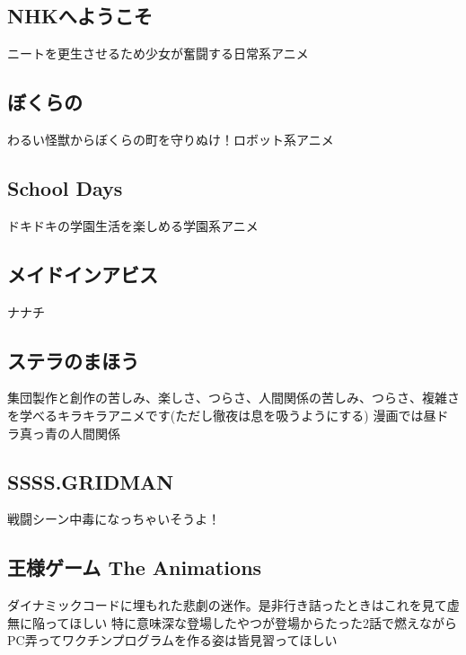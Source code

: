 \documentclass{jarticle}
\begin{document}
   \subsection{NHKへようこそ}
      ニートを更生させるため少女が奮闘する日常系アニメ
   \subsection{ぼくらの}
      わるい怪獣からぼくらの町を守りぬけ！ロボット系アニメ
   \subsection{School Days}
      ドキドキの学園生活を楽しめる学園系アニメ
   \subsection{メイドインアビス}
      ナナチ
   \subsection{ステラのまほう}
      集団製作と創作の苦しみ、楽しさ、つらさ、人間関係の苦しみ、つらさ、複雑さを学べるキラキラアニメです(ただし徹夜は息を吸うようにする)
      漫画では昼ドラ真っ青の人間関係
   \subsection{SSSS.GRIDMAN}
      戦闘シーン中毒になっちゃいそうよ！
   \subsection{王様ゲーム The Animations}
      ダイナミックコードに埋もれた悲劇の迷作。是非行き詰ったときはこれを見て虚無に陥ってほしい
      特に意味深な登場したやつが登場からたった2話で燃えながらPC弄ってワクチンプログラムを作る姿は皆見習ってほしい
\end{document}
